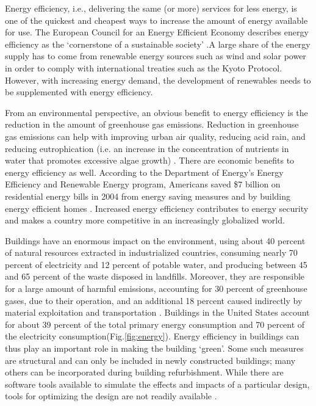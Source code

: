 Energy efficiency, i.e., delivering the same (or more) services for less energy, is one of the quickest and cheapest ways to increase the amount of energy available for use. The European Council for an Energy Efficient Economy describes energy efficiency  as the `cornerstone of a sustainable society' \cite{ecees}.A large share of the energy supply has to come from renewable energy sources such as wind and solar power in order to comply with international treaties such as the Kyoto Protocol. However, with increasing energy demand, the development of renewables needs to be supplemented with energy efficiency.

From an environmental perspective, an obvious benefit to energy efficiency is 
the reduction in the amount of greenhouse gas emissions. Reduction in greenhouse gas emissions can help with  improving urban air quality, reducing acid rain, and reducing eutrophication (i.e. an increase in the concentration of nutrients in water that promotes excessive algae growth) \cite{ecees}. There are economic benefits to energy efficiency as well. According to the Department of Energy's Energy Efficiency and Renewable Energy program, Americans saved \$7 billion on residential energy bills in 2004 from energy saving measures and by building energy efficient homes \cite{wri}. Increased energy efficiency contributes to energy security and makes a country more competitive in an increasingly globalized world. 

Buildings have an enormous impact on the environment, using about 40 percent of natural resources extracted in industrialized countries, consuming nearly 70 percent of electricity and 12 percent of potable water, and producing between 45 and 65 percent of the waste disposed in landfills. Moreover, they are responsible for a large amount of harmful emissions, accounting for 30 percent of greenhouse gases, due to their operation, and an additional 18 percent caused indirectly by material exploitation and transportation \cite{Castro-Lacouture2009}. Buildings in the United States account for about 39 percent of the total primary energy consumption and 70 percent of the electricity consumption(Fig.\ref{fig:energy})\cite{Wang2005a}. Energy efficiency in buildings can thus play an important role in making the building `green'. Some such measures are structural and can only be included in newly constructed buildings; many others can be incorporated during building refurbishment. While there are software tools available to simulate the effects and impacts of a particular design, tools for optimizing the design are not readily available \cite{Wang2005b} \cite{Pernodet2009}.

